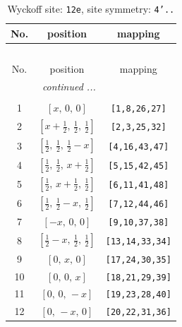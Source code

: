 \documentclass[fleqn,8pt]{jsarticle}
\begin{document}
\begin{longtable}{ccc}
\caption{Wyckoff site: {\tt 12e}, site symmetry: {\tt 4'..}}
 \\
 \hline \hline
No. & position & mapping \\ \hline \endfirsthead

\multicolumn{2}{l}{\tablename\ \thetable{}} \\
 \hline \hline
No. & position & mapping \\ \hline \endhead

 \hline \hline
\multicolumn{2}{r}{\footnotesize\it continued ...} \\ \endfoot

 \hline \hline
\multicolumn{2}{r}{} \\ \endlastfoot

1 & $\left[ x,\, 0,\, 0 \right]$ & {\tt [1,8,26,27]} \\ \hline
2 & $\left[ x + \frac{1}{2},\, \frac{1}{2},\, \frac{1}{2} \right]$ & {\tt [2,3,25,32]} \\ \hline
3 & $\left[ \frac{1}{2},\, \frac{1}{2},\, \frac{1}{2} - x \right]$ & {\tt [4,16,43,47]} \\ \hline
4 & $\left[ \frac{1}{2},\, \frac{1}{2},\, x + \frac{1}{2} \right]$ & {\tt [5,15,42,45]} \\ \hline
5 & $\left[ \frac{1}{2},\, x + \frac{1}{2},\, \frac{1}{2} \right]$ & {\tt [6,11,41,48]} \\ \hline
6 & $\left[ \frac{1}{2},\, \frac{1}{2} - x,\, \frac{1}{2} \right]$ & {\tt [7,12,44,46]} \\ \hline
7 & $\left[ - x,\, 0,\, 0 \right]$ & {\tt [9,10,37,38]} \\ \hline
8 & $\left[ \frac{1}{2} - x,\, \frac{1}{2},\, \frac{1}{2} \right]$ & {\tt [13,14,33,34]} \\ \hline
9 & $\left[ 0,\, x,\, 0 \right]$ & {\tt [17,24,30,35]} \\ \hline
10 & $\left[ 0,\, 0,\, x \right]$ & {\tt [18,21,29,39]} \\ \hline
11 & $\left[ 0,\, 0,\, - x \right]$ & {\tt [19,23,28,40]} \\ \hline
12 & $\left[ 0,\, - x,\, 0 \right]$ & {\tt [20,22,31,36]} \\
\end{longtable}
\renewcommand{\arraystretch}{1.2}
\end{document}
